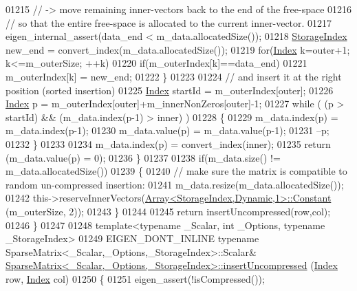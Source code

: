 \begin{DoxyCode}
01215       \textcolor{comment}{//  -> move remaining inner-vectors back to the end of the free-space}
01216       \textcolor{comment}{//     so that the entire free-space is allocated to the current inner-vector.}
01217       eigen\_internal\_assert(data\_end < m\_data.allocatedSize());
01218       \hyperlink{group___sparse_core___module_a0b540ba724726ebe953f8c0df06081ed}{StorageIndex} new\_end = convert\_index(m\_data.allocatedSize());
01219       \textcolor{keywordflow}{for}(\hyperlink{group___core___module_a554f30542cc2316add4b1ea0a492ff02}{Index} k=outer+1; k<=m\_outerSize; ++k)
01220         \textcolor{keywordflow}{if}(m\_outerIndex[k]==data\_end)
01221           m\_outerIndex[k] = new\_end;
01222     \}
01223     
01224     \textcolor{comment}{// and insert it at the right position (sorted insertion)}
01225     \hyperlink{group___core___module_a554f30542cc2316add4b1ea0a492ff02}{Index} startId = m\_outerIndex[outer];
01226     \hyperlink{group___core___module_a554f30542cc2316add4b1ea0a492ff02}{Index} p = m\_outerIndex[outer]+m\_innerNonZeros[outer]-1;
01227     \textcolor{keywordflow}{while} ( (p > startId) && (m\_data.index(p-1) > inner) )
01228     \{
01229       m\_data.index(p) = m\_data.index(p-1);
01230       m\_data.value(p) = m\_data.value(p-1);
01231       --p;
01232     \}
01233     
01234     m\_data.index(p) = convert\_index(inner);
01235     \textcolor{keywordflow}{return} (m\_data.value(p) = 0);
01236   \}
01237   
01238   \textcolor{keywordflow}{if}(m\_data.size() != m\_data.allocatedSize())
01239   \{
01240     \textcolor{comment}{// make sure the matrix is compatible to random un-compressed insertion:}
01241     m\_data.resize(m\_data.allocatedSize());
01242     this->reserveInnerVectors(\hyperlink{group___core___module_class_eigen_1_1_array}{Array<StorageIndex,Dynamic,1>::Constant}
      (m\_outerSize, 2));
01243   \}
01244   
01245   \textcolor{keywordflow}{return} insertUncompressed(row,col);
01246 \}
01247     
01248 \textcolor{keyword}{template}<\textcolor{keyword}{typename} \_Scalar, \textcolor{keywordtype}{int} \_Options, \textcolor{keyword}{typename} \_StorageIndex>
01249 EIGEN\_DONT\_INLINE \textcolor{keyword}{typename} SparseMatrix<\_Scalar,\_Options,\_StorageIndex>::Scalar& 
      \hyperlink{group___sparse_core___module_class_eigen_1_1_sparse_matrix}{SparseMatrix<\_Scalar,\_Options,\_StorageIndex>::insertUncompressed}
      (\hyperlink{group___core___module_a554f30542cc2316add4b1ea0a492ff02}{Index} row, \hyperlink{group___core___module_a554f30542cc2316add4b1ea0a492ff02}{Index} col)
01250 \{
01251   eigen\_assert(!isCompressed());

\end{DoxyCode}
